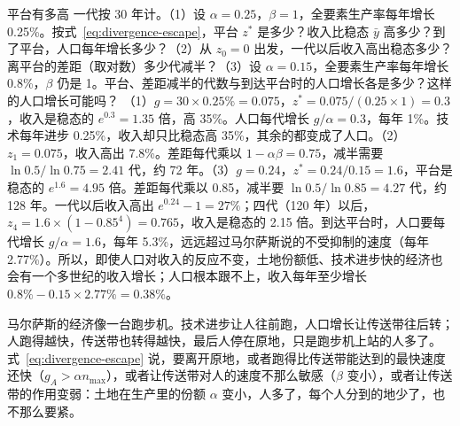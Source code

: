 \begin{example}{平台有多高}\label{ex:divergence-plateau}
一代按 30 年计。（1）设 $\alpha=0.25$，$\beta=1$，全要素生产率每年增长 0.25\%。按式~\eqref{eq:divergence-escape}，平台 $z^{*}$ 是多少？收入比稳态 $\bar y$ 高多少？到了平台，人口每年增长多少？（2）从 $z_0=0$ 出发，一代以后收入高出稳态多少？离平台的差距（取对数）多少代减半？（3）设 $\alpha=0.15$，全要素生产率每年增长 0.8\%，$\beta$ 仍是 1。平台、差距减半的代数与到达平台时的人口增长各是多少？这样的人口增长可能吗？
\solution （1）$g=30\times0.25\%=0.075$，$z^{*}=0.075/(0.25\times1)=0.3$，收入是稳态的 $e^{0.3}=1.35$ 倍，高 35\%。人口每代增长 $g/\alpha=0.3$，每年 1\%。技术每年进步 0.25\%，收入却只比稳态高 35\%，其余的都变成了人口。（2）$z_1=0.075$，收入高出 7.8\%。差距每代乘以 $1-\alpha\beta=0.75$，减半需要 $\ln0.5/\ln0.75=2.41$ 代，约 72 年。（3）$g=0.24$，$z^{*}=0.24/0.15=1.6$，平台是稳态的 $e^{1.6}=4.95$ 倍。差距每代乘以 0.85，减半要 $\ln0.5/\ln0.85=4.27$ 代，约 128 年。一代以后收入高出 $e^{0.24}-1=27\%$；四代（120 年）以后，$z_4=1.6\times(1-0.85^{4})=0.765$，收入是稳态的 2.15 倍。到达平台时，人口要每代增长 $g/\alpha=1.6$，每年 5.3\%，远远超过马尔萨斯说的不受抑制的速度（每年 2.77\%）。所以，即使人口对收入的反应不变，土地份额低、技术进步快的经济也会有一个多世纪的收入增长；人口根本跟不上，收入每年至少增长 $0.8\%-0.15\times2.77\%=0.38\%$。
\end{example}

\begin{intuition}[跑步机]
马尔萨斯的经济像一台跑步机。技术进步让人往前跑，人口增长让传送带往后转；人跑得越快，传送带也转得越快，最后人停在原地，只是跑步机上站的人多了。式~\eqref{eq:divergence-escape} 说，要离开原地，或者跑得比传送带能达到的最快速度还快（$g_{A}>\alpha n_{\max}$），或者让传送带对人的速度不那么敏感（$\beta$ 变小），或者让传送带的作用变弱：土地在生产里的份额 $\alpha$ 变小，人多了，每个人分到的地少了，也不那么要紧。
\end{intuition}


